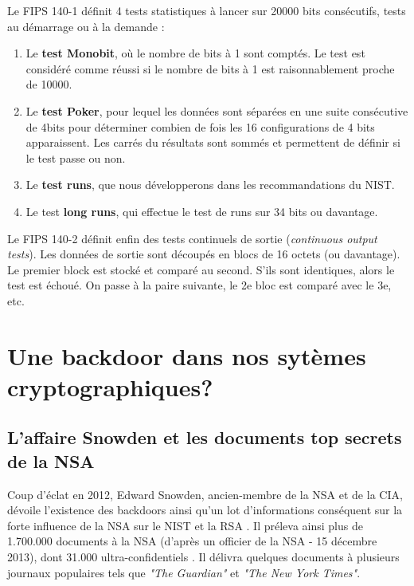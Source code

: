 		Le FIPS 140-1 définit 4 tests statistiques à lancer sur 20000 bits consécutifs, 
		tests au démarrage ou à la demande : 
		\begin{enumerate}
		\item Le \textbf{test Monobit}, où le nombre de bits à 1 sont comptés. 
		Le test est considéré comme réussi si le nombre de bits à 1 est 
		raisonnablement proche de 10000.
		\item Le \textbf{test Poker}, pour lequel les données sont séparées en 
		une suite consécutive de 4bits pour déterminer combien de fois les 16 
		configurations de 4 bits apparaissent. Les carrés du résultats sont sommés 
		et permettent de définir si le test passe ou non. 
		\item Le \textbf{test runs}, que nous développerons dans les 
		recommandations du NIST.
		\item Le test \textbf{long runs}, qui effectue le test de runs sur 
		34 bits ou davantage.\\
		\end{enumerate}
		
		
		Le FIPS 140-2 définit enfin des tests continuels de sortie 
		(\textit{continuous output tests}). Les données de sortie sont découpés 
		en blocs de 16 octets (ou davantage). Le premier block est stocké et 
		comparé au second. S'ils sont identiques, alors le test est échoué. On passe 
		à la paire suivante, le 2e bloc est comparé avec le 3e, etc.

\section{Une backdoor dans nos sytèmes cryptographiques?}

	\subsection{L'affaire Snowden et les documents top secrets de la NSA}
	
	Coup d'éclat en 2012, Edward Snowden, ancien-membre de la NSA et de
	la CIA,	dévoile l'existence des backdoors ainsi qu'un lot
	d'informations conséquent sur la forte influence de la NSA
	sur le NIST et la RSA \cite{snowden2013reuters}.	Il préleva ainsi plus de 1.700.000 documents à la NSA (d'après un 
	officier de la NSA - 15 décembre 2013), dont 31.000 
	ultra-confidentiels \cite{wikiSnowden}.	Il délivra quelques documents à plusieurs journaux populaires
	tels que \textit{"The Guardian"} et \textit{"The New York Times"}.\\
	
